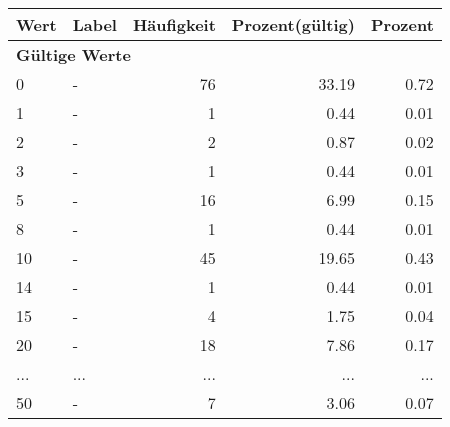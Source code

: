      \begin{longtable}{lXrrr}
     \toprule
     \textbf{Wert} & \textbf{Label} & \textbf{Häufigkeit} & \textbf{Prozent(gültig)} & \textbf{Prozent} \\
     \endhead
     \midrule
     \multicolumn{5}{l}{\textbf{Gültige Werte}}\\
        0 & \multicolumn{1}{X}{-} & %
          \num{76} &
          \num[round-mode=places,round-precision=2]{33.19} &
          \num[round-mode=places,round-precision=2]{0.72} \\
        1 & \multicolumn{1}{X}{-} & %
          \num{1} &
          \num[round-mode=places,round-precision=2]{0.44} &
          \num[round-mode=places,round-precision=2]{0.01} \\
        2 & \multicolumn{1}{X}{-} & %
          \num{2} &
          \num[round-mode=places,round-precision=2]{0.87} &
          \num[round-mode=places,round-precision=2]{0.02} \\
        3 & \multicolumn{1}{X}{-} & %
          \num{1} &
          \num[round-mode=places,round-precision=2]{0.44} &
          \num[round-mode=places,round-precision=2]{0.01} \\
        5 & \multicolumn{1}{X}{-} & %
          \num{16} &
          \num[round-mode=places,round-precision=2]{6.99} &
          \num[round-mode=places,round-precision=2]{0.15} \\
        8 & \multicolumn{1}{X}{-} & %
          \num{1} &
          \num[round-mode=places,round-precision=2]{0.44} &
          \num[round-mode=places,round-precision=2]{0.01} \\
        10 & \multicolumn{1}{X}{-} & %
          \num{45} &
          \num[round-mode=places,round-precision=2]{19.65} &
          \num[round-mode=places,round-precision=2]{0.43} \\
        14 & \multicolumn{1}{X}{-} & %
          \num{1} &
          \num[round-mode=places,round-precision=2]{0.44} &
          \num[round-mode=places,round-precision=2]{0.01} \\
        15 & \multicolumn{1}{X}{-} & %
          \num{4} &
          \num[round-mode=places,round-precision=2]{1.75} &
          \num[round-mode=places,round-precision=2]{0.04} \\
        20 & \multicolumn{1}{X}{-} & %
          \num{18} &
          \num[round-mode=places,round-precision=2]{7.86} &
          \num[round-mode=places,round-precision=2]{0.17} \\
       ... & ... & ... & ... & ... \\
        50 & \multicolumn{1}{X}{-} & %
          \num{7} &
          \num[round-mode=places,round-precision=2]{3.06} &
          \num[round-mode=places,round-precision=2]{0.07} \\


\end{longtable}
